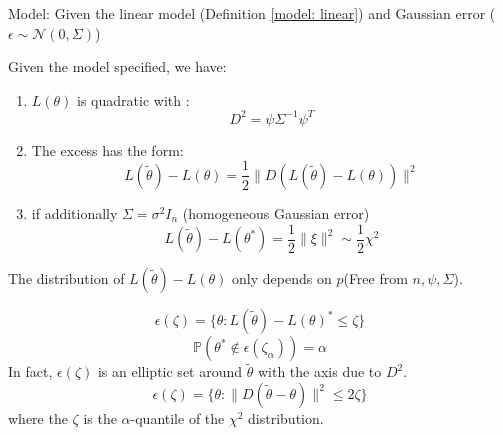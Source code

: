 Model: Given the  linear model (Definition \ref{model: linear}) and Gaussian error ($\epsilon \sim \mathcal{N}(0, \Sigma)$)
\begin{theorem}
Given the model specified, we have:
	\begin{enumerate}
		\item $L(\theta)$ is quadratic with :
			\begin{equation*}
				D^2 = \psi \Sigma^{-1} \psi^T
			\end{equation*}
		\item The excess has the form:
			\begin{equation*}
				L(\tilde{\theta}) - L(\theta) = \frac{1}{2} \| D (L(\tilde{\theta}) - L(\theta)) \|^2 
			\end{equation*}
		\item if additionally $\Sigma = \sigma^2 I_n$ (homogeneous Gaussian error)
			\begin{equation} 
				L(\tilde{\theta}) - L(\theta^*) = \frac{1}{2} \| \xi \|^2 \sim \frac{1}{2} \chi^2
			\end{equation}
	\end{enumerate}
	The distribution of $L(\tilde{\theta}) - L(\theta)$ only depends on $p$(Free from $n, \psi, \Sigma$).
\end{theorem}


\begin{corollary}
	\begin{equation*}
		\epsilon(\zeta)= \{ \theta : L(\tilde{\theta}) - L(\theta)^* \leq \zeta \}
	\end{equation*}
	\begin{equation*}
		\mathbb{P} (\theta^* \notin \epsilon(\zeta_\alpha) ) = \alpha
	\end{equation*}
	In fact, $\epsilon(\zeta)$ is an elliptic set around $\tilde{\theta}$ with the axis due to $D^2$.
	\begin{equation*}
		\epsilon(\zeta) = \{\theta: \| D (\tilde{\theta} - \theta) \|^2 \leq 2 \zeta \}
	\end{equation*}
	where the $\zeta$ is the $\alpha$-quantile of the $\chi^2$ distribution.
\end{corollary}


